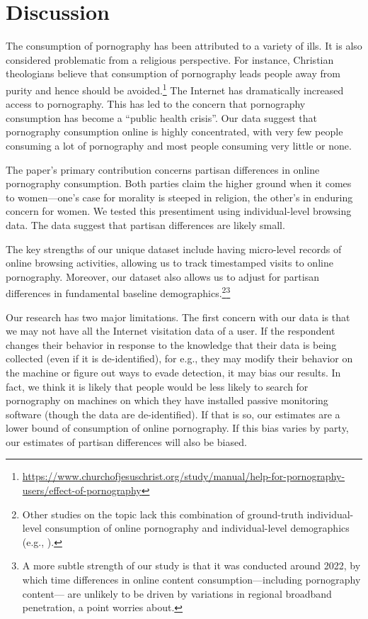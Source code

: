 \documentclass[12pt, letterpaper]{article}
\begin{document}
\section{Discussion}
\label{sec:discussion}
The consumption of pornography has been attributed to a variety of ills. It is also considered problematic from a religious perspective. For instance, Christian theologians believe that consumption of pornography leads people away from purity and hence should be avoided.\footnote{\url{https://www.churchofjesuschrist.org/study/manual/help-for-pornography-users/effect-of-pornography}} The Internet has dramatically increased access to pornography. This has led to the concern that pornography consumption has become a ``public health crisis''. Our data suggest that pornography consumption online is highly concentrated, with very few people consuming a lot of pornography and most people consuming very little or none.

The paper's primary contribution concerns partisan differences in online pornography consumption. Both parties claim the higher ground when it comes to women—one's case for morality is steeped in religion, the other's in enduring concern for women. We tested this presentiment using individual-level browsing data. The data suggest that partisan differences are likely small.

The key strengths of our unique dataset include having micro-level records of online browsing activities, allowing us to track timestamped visits to online pornography. Moreover, our dataset also allows us to adjust for partisan differences in fundamental baseline demographics.\footnote{Other studies on the topic lack this combination of ground-truth individual-level consumption of online pornography and individual-level demographics (e.g., \cite{Peek1982-ua, Woodrum1992-vk, Markey2011-xo, Perry2020-cp, Ybarra2005-id, Perry2018-cw, Price2016-sm, webporn, Wright2013-gl}).}\footnote{A more subtle strength of our study is that it was conducted around 2022, by which time differences in online content consumption---including pornography content--- are unlikely to be driven by variations in regional broadband penetration, a point \cite{edelman2009markets} worries about.}

Our research has two major limitations. The first concern with our data is that we may not have all the Internet visitation data of a user. If the respondent changes their behavior in response to the knowledge that their data is being collected (even if it is de-identified), for e.g., they may modify their behavior on the machine or figure out ways to evade detection, it may bias our results. In fact, we think it is likely that people would be less likely to search for pornography on machines on which they have installed passive monitoring software (though the data are de-identified). If that is so, our estimates are a lower bound of consumption of online pornography. If this bias varies by party, our estimates of partisan differences will also be biased. 
\end{document}
